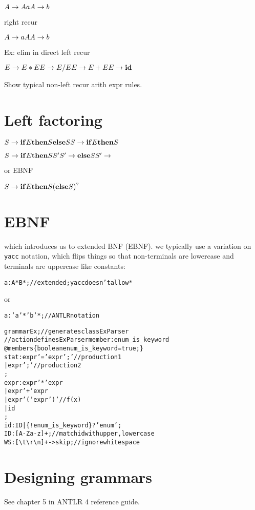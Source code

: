\documentclass[11pt,twocolumn,nocopyright]{sigplanconf}
\begin{document}
\noindent $
A \rightarrow A a\\
A \rightarrow b\\
$

right recur

\noindent $
A \rightarrow a A\\
A \rightarrow b\\
$

Ex: elim in direct left recur

\noindent $
E \rightarrow E * E\\
E \rightarrow E / E\\
E \rightarrow E + E\\
E \rightarrow {\bf id}\\
$

Show typical non-left recur arith expr rules.

\section{Left factoring}

\noindent $
S \rightarrow {\bf if} E {\bf then} S {\bf else} S\\
S \rightarrow {\bf if} E {\bf then} S\\
$

\noindent $
S \rightarrow {\bf if} E {\bf then} S S'\\
S' \rightarrow {\bf else} S \\
S' \rightarrow
$

or EBNF

\noindent $
S \rightarrow {\bf if} E {\bf then} S ({\bf else} S)^?\\
$
\section{EBNF}

which introduces us to extended BNF (EBNF). we typically use a variation on {\tt yacc} notation, which flips things so that non-terminals are lowercase and terminals are uppercase like constants:

\begin{alltt}
a : A* B* ; // extended; yacc doesn't allow *
\end{alltt}

or

\begin{alltt}
a : 'a'* 'b'* ; // ANTLR notation
\end{alltt}

\begin{alltt}\small
grammar Ex; // generates class ExParser
// action defines ExParser member: enum_is_keyword
@members \{boolean enum_is_keyword = true;\}
stat: expr '=' expr ';' // production 1
    | expr ';'          // production 2
    ;
expr: expr '*' expr
    | expr '+' expr
    | expr '(' expr ')' // f(x)
    | id
    ;
id  : ID | \{!enum_is_keyword\}? 'enum' ;
ID  : [A-Za-z]+ ; // match id with upper, lowercase
WS  : [ \textbackslash{}t\textbackslash{}r\textbackslash{}n]+ -> skip ; // ignore whitespace
\end{alltt}

\section{Designing grammars}

See chapter 5 in ANTLR 4 reference guide.
\end{document}
